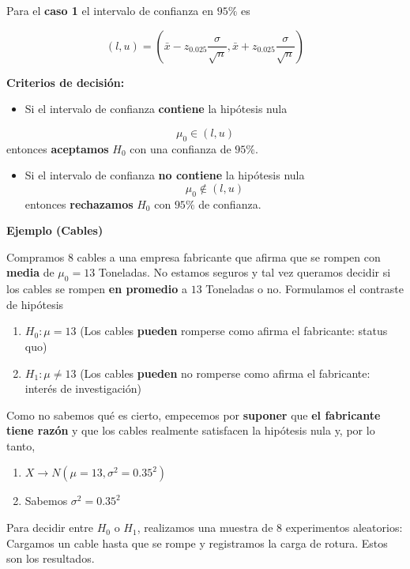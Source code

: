 \documentclass[
]{book}
\providecommand{\tightlist}{%
  \setlength{\itemsep}{0pt}\setlength{\parskip}{0pt}}
\begin{document}
Para el \textbf{caso 1} el intervalo de confianza en \(95\%\) es

\[(l,u)=(\bar{x}-z_{0.025} \frac{\sigma}{\sqrt{n}}, \bar{x}+z_{0.025} \frac{\sigma}{ \sqrt{n}})\]

\textbf{Criterios de decisión:}

\begin{itemize}
\tightlist
\item
  Si el intervalo de confianza \textbf{contiene} la hipótesis nula
\end{itemize}

\[\mu_0\in (l,u)\] entonces \textbf{aceptamos} \(H_0\) con una confianza de \(95\%\).

\begin{itemize}
\tightlist
\item
  Si el intervalo de confianza \textbf{no contiene} la hipótesis nula\[\mu_0\notin (l,u)\] entonces \textbf{rechazamos} \(H_0\) con \(95\%\) de confianza.
\end{itemize}

\textbf{Ejemplo (Cables)}

Compramos \(8\) cables a una empresa fabricante que afirma que se rompen con \textbf{media} de \(\mu_0=13\) Toneladas. No estamos seguros y tal vez queramos decidir si los cables se rompen \textbf{en promedio} a \(13\) Toneladas o no. Formulamos el contraste de hipótesis

\begin{enumerate}
\def\labelenumi{\alph{enumi}.}
\tightlist
\item
  \(H_0:\mu = 13\) (Los cables \textbf{pueden} romperse como afirma el fabricante: status quo)
\item
  \(H_1:\mu \neq 13\) (Los cables \textbf{pueden} no romperse como afirma el fabricante: interés de investigación)
\end{enumerate}

Como no sabemos qué es cierto, empecemos por \textbf{suponer} que \textbf{el fabricante tiene razón} y que los cables realmente satisfacen la hipótesis nula y, por lo tanto,

\begin{enumerate}
\def\labelenumi{\arabic{enumi}.}
\tightlist
\item
  \(X \rightarrow N(\mu=13, \sigma^2=0.35^2)\)
\item
  Sabemos \(\sigma^2=0.35^2\)
\end{enumerate}

Para decidir entre \(H_0\) o \(H_1\), realizamos una muestra de \(8\) experimentos aleatorios: Cargamos un cable hasta que se rompe y registramos la carga de rotura. Estos son los resultados.
\end{document}

